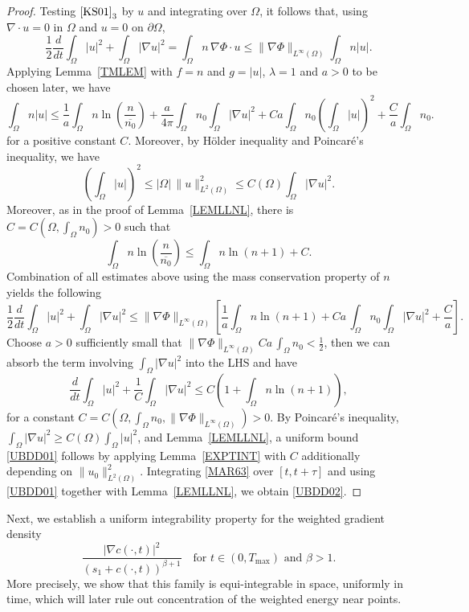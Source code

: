 \documentclass{amsart}
\numberwithin{equation}{section}
\begin{document}
\begin{proof}
Testing $\eqref{KS01}_{3}$ by $u$ and integrating over $\Omega$, it follows that, using $\nabla\cdot u=0$ in $\Omega$ and $u=0$ on $\partial\Omega$, 
\[
\frac12\frac{d}{dt}\int_\Omega |u|^2 + \int_\Omega |\nabla u|^2
= \int_\Omega n\,\nabla\Phi\cdot u
\le \|\nabla\Phi\|_{L^\infty(\Omega)}\int_\Omega n|u|.
\] 
Applying Lemma~\ref{TMLEM} with $f=n$ and $g=|u|$, $\lambda =1$ and $a>0$ to be chosen later, we have
\[
\int_{\Omega}n |u|
\le   \frac{1}{a}\int_{\Omega} n\ln\left(\frac{n}{\overline{n_0}}\right)+\frac{a}{4\pi}\int_{\Omega}n_0\int_{\Omega}|\nabla u|^{2}+Ca\int_{\Omega}n_0\left(\int_{\Omega}|u|\right)^{2}+\frac{C}{a}\int_{\Omega}n_0.
\]
for a positive constant $C$. Moreover, by H\"{o}lder inequality and Poincar\'e's inequality, we have 
\[
\left(\int_\Omega |u|\right)^2 \le |\Omega|\,\|u\|_{L^2(\Omega)}^2 \le C(\Omega)\int_\Omega |\nabla u|^2.
\]
Moreover, as in the proof of Lemma~\ref{LEMLLNL}, there is $C=C(\Omega, \int_{\Omega}n_0)>0$ such that  
\[
\int_\Omega n\ln\left(\frac{n}{\overline{n_0}}\right)
\le \int_\Omega n\ln(n+1) + C.
\]
Combination of all estimates above using the mass conservation property of $n$ yields the following 
\[
\frac12\frac{d}{dt}\int_\Omega |u|^2 + \int_\Omega |\nabla u|^2
\le \|\nabla\Phi\|_{L^{\infty}(\Omega)} 
\left[
\frac{1}{a}\int_\Omega n\ln(n+1) + C a\,\int_{\Omega}n_0 \int_\Omega |\nabla u|^2 + \frac{C}{a}
\right].
\]
Choose $a>0$ sufficiently small that $\|\nabla\Phi\|_{L^{\infty}(\Omega)} C a\,\int_{\Omega}n_0 <\frac{1}{2}$, then we can absorb the term involving $\int_{\Omega}|\nabla u|^2$ into the LHS and have 
\begin{equation}\label{MAR63}
\frac{d}{dt}\int_\Omega |u|^2 + \frac{1}{C}\int_\Omega |\nabla u|^2
\le C\left(1+\int_\Omega n\ln(n+1)\right),
\end{equation}
for a constant $C=C(\Omega, \int_{\Omega} n_0, \|\nabla \Phi\|_{L^{\infty}(\Omega)})>0$. 
By Poincar\'e's inequality, $\int_\Omega |\nabla u|^2 \ge C(\Omega)\int_\Omega |u|^2$, and Lemma~\ref{LEMLLNL}, a uniform bound \eqref{UBDD01} follows by applying Lemma~\ref{EXPTINT} with $C$ additionally depending on $\|u_0\|^{2}_{L^2(\Omega)}$. 
Integrating \eqref{MAR63} over $[t,t+\tau]$ and using \eqref{UBDD01} together with Lemma~\ref{LEMLLNL}, we obtain \eqref{UBDD02}.
\end{proof}



 Next, we establish a uniform integrability property for the weighted gradient density
\[
\frac{|\nabla c(\cdot,t)|^{2}}{(s_{1}+c(\cdot,t))^{\beta+1}}
\quad \mbox{for } t\in(0,T_{\max})  \mbox{ and }  \beta>1.
\]
More precisely, we show that this family is equi-integrable in space, uniformly in time,
which will later rule out concentration of the weighted energy near points.
\end{document}
